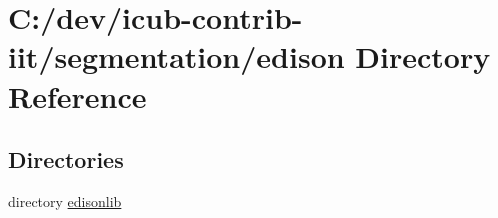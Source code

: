 \section{C\+:/dev/icub-\/contrib-\/iit/segmentation/edison Directory Reference}
\label{dir_c8f5c4d6f826361c401baddc9909b4b2}
\subsection*{Directories}
\begin{DoxyCompactItemize}
\item 
directory \hyperlink{dir_e4f27251772675b4a85a1732d22dafa8}{edisonlib}
\end{DoxyCompactItemize}
